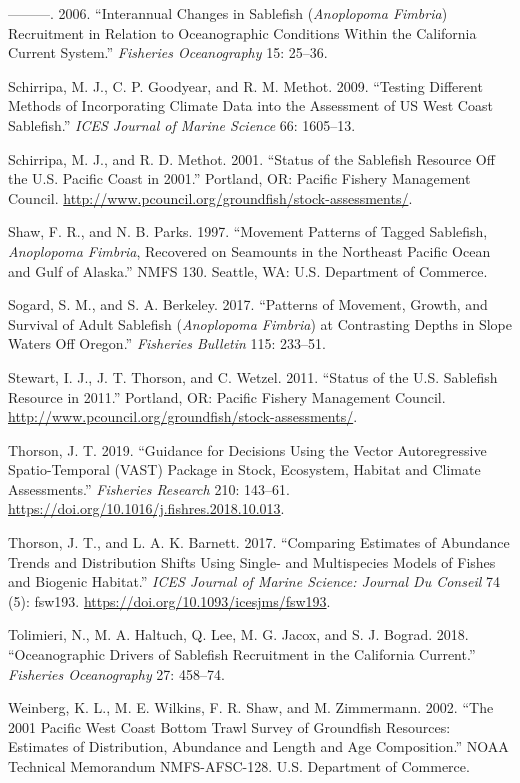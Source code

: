 \documentclass[11pt,
  english,
  a4paper,
]{article}
\newlength{\cslhangindent}
\newenvironment{cslreferences}%
  {\setlength{\parindent}{0pt}%
  \everypar{\setlength{\hangindent}{\cslhangindent}}\ignorespaces}%
  {\par}
\begin{document}
\begin{cslreferences}
\leavevmode\hypertarget{ref-schirripa2006}{}%
---------. 2006. ``Interannual Changes in Sablefish (\emph{Anoplopoma Fimbria}) Recruitment in Relation to Oceanographic Conditions Within the California Current System.'' \emph{Fisheries Oceanography} 15: 25--36.

\leavevmode\hypertarget{ref-schirripa2009icesjms}{}%
Schirripa, M. J., C. P. Goodyear, and R. M. Methot. 2009. ``Testing Different Methods of Incorporating Climate Data into the Assessment of US West Coast Sablefish.'' \emph{ICES Journal of Marine Science} 66: 1605--13.

\leavevmode\hypertarget{ref-schirripa2001sablefish}{}%
Schirripa, M. J., and R. D. Methot. 2001. ``Status of the Sablefish Resource Off the U.S. Pacific Coast in 2001.'' Portland, OR: Pacific Fishery Management Council. \url{http://www.pcouncil.org/groundfish/stock-assessments/}.

\leavevmode\hypertarget{ref-shaw1997}{}%
Shaw, F. R., and N. B. Parks. 1997. ``Movement Patterns of Tagged Sablefish, \emph{Anoplopoma Fimbria}, Recovered on Seamounts in the Northeast Pacific Ocean and Gulf of Alaska.'' NMFS 130. Seattle, WA: U.S. Department of Commerce.

\leavevmode\hypertarget{ref-sogard2017}{}%
Sogard, S. M., and S. A. Berkeley. 2017. ``Patterns of Movement, Growth, and Survival of Adult Sablefish (\emph{Anoplopoma Fimbria}) at Contrasting Depths in Slope Waters Off Oregon.'' \emph{Fisheries Bulletin} 115: 233--51.

\leavevmode\hypertarget{ref-stewart2011sablefish}{}%
Stewart, I. J., J. T. Thorson, and C. Wetzel. 2011. ``Status of the U.S. Sablefish Resource in 2011.'' Portland, OR: Pacific Fishery Management Council. \url{http://www.pcouncil.org/groundfish/stock-assessments/}.

\leavevmode\hypertarget{ref-thorson_guidance_2019}{}%
Thorson, J. T. 2019. ``Guidance for Decisions Using the Vector Autoregressive Spatio-Temporal (VAST) Package in Stock, Ecosystem, Habitat and Climate Assessments.'' \emph{Fisheries Research} 210: 143--61. \url{https://doi.org/10.1016/j.fishres.2018.10.013}.

\leavevmode\hypertarget{ref-thorson_comparing_2017}{}%
Thorson, J. T., and L. A. K. Barnett. 2017. ``Comparing Estimates of Abundance Trends and Distribution Shifts Using Single- and Multispecies Models of Fishes and Biogenic Habitat.'' \emph{ICES Journal of Marine Science: Journal Du Conseil} 74 (5): fsw193. \url{https://doi.org/10.1093/icesjms/fsw193}.

\leavevmode\hypertarget{ref-tolimieri2018}{}%
Tolimieri, N., M. A. Haltuch, Q. Lee, M. G. Jacox, and S. J. Bograd. 2018. ``Oceanographic Drivers of Sablefish Recruitment in the California Current.'' \emph{Fisheries Oceanography} 27: 458--74.

\leavevmode\hypertarget{ref-weinberg_2001_2002}{}%
Weinberg, K. L., M. E. Wilkins, F. R. Shaw, and M. Zimmermann. 2002. ``The 2001 Pacific West Coast Bottom Trawl Survey of Groundfish Resources: Estimates of Distribution, Abundance and Length and Age Composition.'' NOAA Technical Memorandum NMFS-AFSC-128. U.S. Department of Commerce.
\end{cslreferences}
\end{document}
